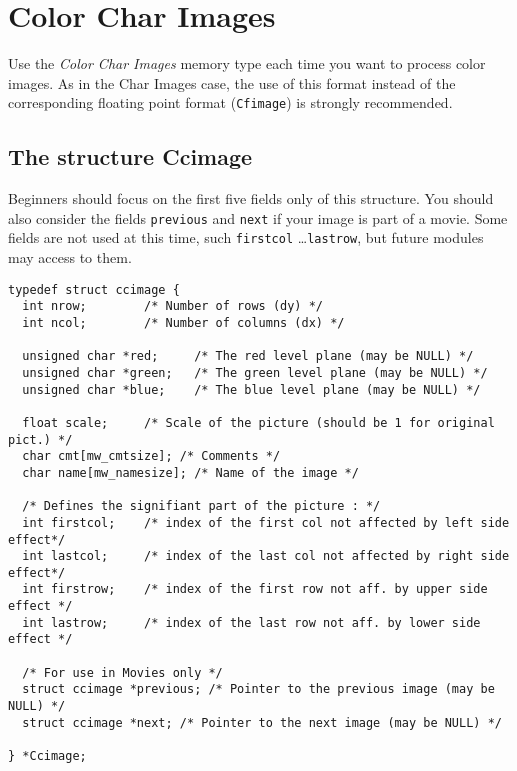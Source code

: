 \section{Color Char Images}

\label{images_color-char-images}

Use the {\em Color Char Images} memory type each time you want to process 
color images. As in the Char Images case, the use of this format instead of the
corresponding floating point format (\verb+Cfimage+) is strongly recommended.

\subsection{The structure Ccimage}
\label{images_color-char-images_structure}

\def\ccimage{{\tt Ccimage }}
\index{structure!\ccimage}

 Beginners should focus on the first five fields only of this structure. 
You should also consider the fields \verb+previous+ and \verb+next+ if your
image is part of a movie.
Some fields are not used at this time, such \verb+firstcol+ \ldots \verb+lastrow+, but future modules may access to them.

{\small
\begin{verbatim}
typedef struct ccimage {
  int nrow;        /* Number of rows (dy) */
  int ncol;        /* Number of columns (dx) */

  unsigned char *red;     /* The red level plane (may be NULL) */
  unsigned char *green;   /* The green level plane (may be NULL) */
  unsigned char *blue;    /* The blue level plane (may be NULL) */

  float scale;     /* Scale of the picture (should be 1 for original pict.) */
  char cmt[mw_cmtsize]; /* Comments */
  char name[mw_namesize]; /* Name of the image */
  
  /* Defines the signifiant part of the picture : */
  int firstcol;    /* index of the first col not affected by left side effect*/
  int lastcol;     /* index of the last col not affected by right side effect*/
  int firstrow;    /* index of the first row not aff. by upper side effect */  
  int lastrow;     /* index of the last row not aff. by lower side effect */  

  /* For use in Movies only */
  struct ccimage *previous; /* Pointer to the previous image (may be NULL) */
  struct ccimage *next; /* Pointer to the next image (may be NULL) */

} *Ccimage;

\end{verbatim}
}

